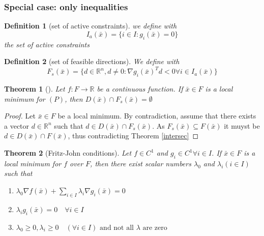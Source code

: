\documentclass{book}
\newcommand{\R}{\mathbb{R}}
\theoremstyle{theoremv2}
\newtheorem{theorem}{Theorem}[chapter]
\theoremstyle{defv2}
\newtheorem{definition}{Definition}[chapter]
\theoremstyle{remark}
\theoremstyle{remark}
\begin{document}
\subsubsection{Special case: only inequalities}
\begin{definition}[set of active constraints]
    we define with 
    \[
        I_a (\bar{x}) = \{ i\in I:g_i(\bar{x})=0 \}
    \]
    the set of active constraints
\end{definition}
\begin{definition}[set of feasible directions]
    We define with 
    \[
        F_s(\bar{x})=\{ d\in\R^n, d\neq0 :\nabla g_i(\bar{x})^Td <0 \forall i \in I_a(\bar{x}) \}
    \]
\end{definition}
\begin{theorem}[]
    \label{theo6}
    Let $f:F\to\R$ be a continuous function. If $\bar{x}\in F$ is a local minimum for $(P)$, then $D(\bar{x})\cap F_s(\bar{x})=\emptyset$
\end{theorem}
\begin{proof}
    Let $\bar{x}\in F$ be a local minimum. By contradiction, assume that there exists a vector $d\in\R^n$ such that $d\in D(\bar{x})\cap F_s(\bar{x})$. As $F_s(\bar{x})\subseteq F(\bar{x})$ it muyst be $d\in D(\bar{x})\cap F(\bar{x})$, thus contradicting Theorem \ref{intersec}
\end{proof}
\begin{theorem}[Fritz-John conditions]
    Let $f\in C^1$ and $g_i\in C^1 \forall i\in I$. If $\bar{x}\in F$ is a local minimum for $f$ over $F$, then there exist scalar numbers $\lambda_0$ and $\lambda_i(i\in I)$ such that 
    \begin{enumerate}
        \item $\lambda_0\nabla f(\bar{x}) + \sum_{i\in I} \lambda_i \nabla g_i(\bar{x})=0$
        \item $\lambda_i g_i(\bar{x})=0 \quad \forall i\in I$
        \item $\lambda_0\geq 0, \lambda_i \geq 0 \quad (\forall i \in I) \text{ and not all } \lambda \text{ are zero}$
    \end{enumerate}
\end{theorem}
\end{document}
